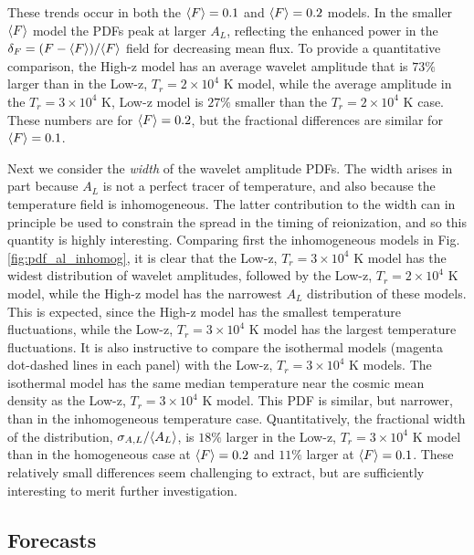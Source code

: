 These trends occur in both the $\langle F \rangle=0.1$ and $\langle F \rangle=0.2$ models. In
the smaller $\langle F \rangle$ model the PDFs peak at larger $A_L$, reflecting the enhanced power in the $\delta_F = (F - \langle F \rangle)/\langle F \rangle$ field for decreasing
mean flux. To provide a quantitative comparison, the High-z model has an average wavelet amplitude that is $73\%$ larger than in the Low-z, 
$T_r = 2 \times 10^4$ K model, while the average amplitude in the $T_r = 3 \times 10^4$ K, Low-z model is $27\%$ smaller than the $T_r =2 \times 10^4$ K 
case. These numbers are for $\langle F \rangle=0.2$, but the fractional differences are similar for $\langle F \rangle=0.1$.

Next we consider the {\em width} of the wavelet amplitude PDFs. The width arises in part because $A_L$ is not a perfect
tracer of temperature, and also because the temperature field is inhomogeneous. The latter contribution to the width 
can in principle be used to constrain the spread in the timing of reionization, and so this quantity is highly interesting. Comparing first
the inhomogeneous models in Fig. \ref{fig:pdf_al_inhomog}, it is clear that the Low-z, $T_r=3 \times 10^4$ K model has
the widest distribution of wavelet amplitudes, followed by the Low-z, $T_r=2 \times 10^4$ K model, while the High-z model
has the narrowest $A_L$ distribution of these models. This is expected, since the High-z model has the smallest temperature
fluctuations, while the Low-z, $T_r = 3 \times 10^4$ K model has the largest temperature fluctuations. It is also instructive
to compare the isothermal models (magenta dot-dashed lines in each panel) with the Low-z, $T_r=3 \times 10^4$ K models. The isothermal model has the same median temperature near the cosmic mean density as the Low-z, $T_r=3 \times 10^4$ K model. This PDF is similar, but narrower, than in the inhomogeneous temperature case. Quantitatively, the fractional width of the distribution, $\sigma_{A,L}/\langle A_L \rangle$, is $18\%$ larger in the Low-z, $T_r=3 \times 10^4$ K model than in the homogeneous case at $\langle F \rangle=0.2$ and
$11\%$ larger at $\langle F \rangle=0.1$. These relatively small differences seem challenging to extract, but are sufficiently interesting to merit further
investigation.



\subsection{Forecasts}

